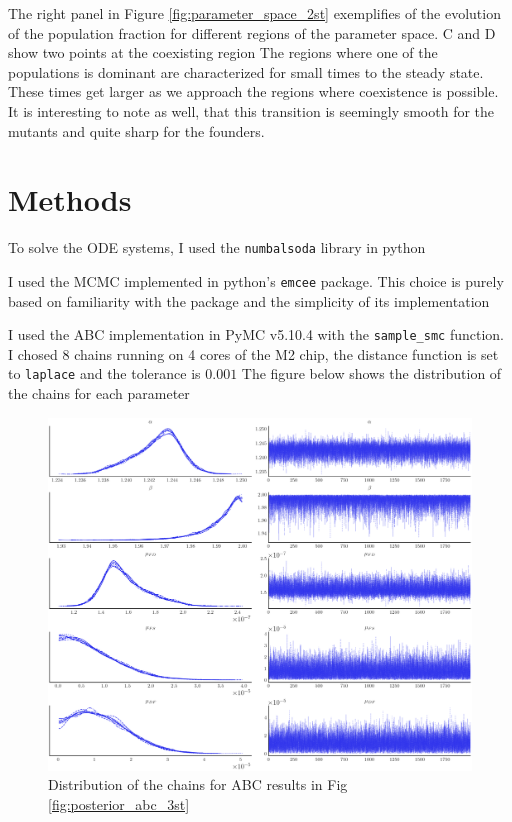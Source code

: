 \documentclass{article}
\begin{document}
The right panel in Figure \ref{fig:parameter_space_2st} exemplifies of the evolution of the population fraction for different regions of the parameter space. C and D show two points at the coexisting region
The regions where one of the populations is dominant are characterized for small times to the steady state. These times get larger as we approach the regions where coexistence is possible. It is interesting to note as well, that this transition is seemingly smooth for the mutants and quite sharp for the founders.



\section{Methods}

To solve the ODE systems, I used the \verb|numbalsoda| library in python

I used the MCMC implemented in python's \verb|emcee| package. This choice is purely based on familiarity with the package and the simplicity of its implementation

I used the ABC implementation in PyMC v5.10.4 with the \verb|sample_smc| function. I chosed 8 chains running on 4 cores of the M2 chip, the distance function is set to \verb|laplace| and the tolerance is $0.001$
The figure below shows the distribution of the chains for each parameter
\begin{figure}[H]
    \centering
    \includegraphics[width=1\linewidth]{plots/abc_3st_param_dist.png}
    \caption{Distribution of the chains for ABC results in Fig \ref{fig:posterior_abc_3st}}
    \label{fig:abc_3st_param_chains}
\end{figure}
\end{document}
